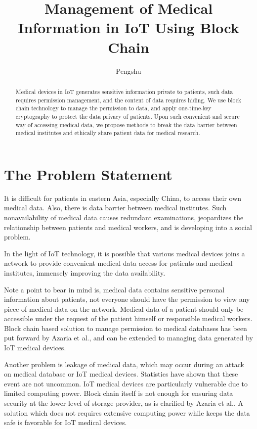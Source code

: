 \documentclass[]{scrartcl}
\title{Management of Medical Information in IoT Using Block Chain}
\author{Pengshu}
\theoremstyle{definition}
\begin{document}
\lstset{language=c}
\maketitle

\begin{abstract}
Medical devices in IoT generates sensitive information private to patients, such data requires permission management, and the content of data requires hiding. We use block chain technology to manage the permission to data, and apply one-time-key cryptography to protect the data privacy of patients. Upon such convenient and secure way of accessing medical data, we propose methods to break the data barrier between medical institutes and ethically share patient data for medical research.
\end{abstract}

\section{The Problem Statement}
It is difficult for patients in eastern Asia, especially China, to access their own medical data. Also, there is data barrier between medical institutes. Such nonavailability of medical data causes redundant examinations, jeopardizes the relationship between patients and medical workers, and is developing into a social problem.

In the light of IoT technology, it is possible that various medical devices joins a network to provide convenient medical data access for patients and medical institutes, immensely improving the data availability.

Note a point to bear in mind is, medical data contains sensitive personal information about patients, not everyone should have the permission to view any piece of medical data on the network. Medical data of a patient should only be accessible under the request of the patient himself or responsible medical workers. Block chain based solution to manage permission to medical databases has been put forward by Azaria et al.\cite{MedRecWhitePaper}, and can be extended to managing data generated by IoT medical devices.

Another problem is leakage of medical data, which may occur during an attack on medical database or IoT medical devices. Statistics have shown that these event are not uncommon. IoT medical devices are particularly vulnerable due to limited computing power. Block chain itself is not enough for ensuring data security at the lower level of storage provider, as is clarified by Azaria et al.\cite{MedRecWhitePaper}. A solution which does not requires extensive computing power while keeps the data safe is favorable for IoT medical devices.
\end{document}
